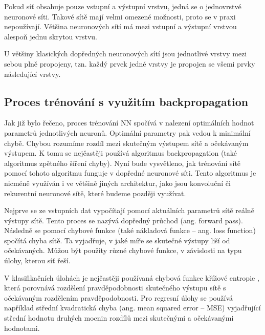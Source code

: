 Pokud síť obsahuje pouze vstupní a výstupní vrstvu, jedná se o jednovrstvé
neuronové síti. Takové sítě mají velmi omezené možnosti, proto se v praxi
nepoužívají. Většina neuronových sítí má mezi vstupní a výstupní vrstvou
alespoň jednu skrytou vrstvu.%

U většiny klasických dopředných neuronových sítí jsou jednotlivé vrstvy mezi
sebou plně propojeny, tzn. každý prvek jedné vrstvy je propojen se všemi prvky
následující vrstvy.


\subsection{Proces trénování s využitím backpropagation}

Jak již bylo řečeno, proces trénování NN spočívá v nalezení optimálních hodnot
parametrů jednotlivých neuronů. Optimální parametry pak vedou k minimální
chybě. Chybou rozumíme rozdíl mezi skutečným výstupem sítě a očekávaným
výstupem. K tomu se nejčastěji používá algoritmus backpropagation (také
algoritmus zpětného šíření chyby). Nyní bude vysvětleno, jak trénování sítě
pomocí tohoto algoritmu funguje v dopředné neuronové síti. Tento algoritmus je
nicméně využíván i ve většině jiných architektur, jako jsou konvoluční či
rekurentní neuronové sítě, které budeme později využívat.

Nejprve se ze vstupních dat vypočítají pomocí aktuálních parametrů sítě reálně
výstupy sítě. Tento proces se nazývá dopředný průchod (ang. forward pass).
Následně se pomocí chybové funkce (také nákladová funkce – ang. loss function)
spočítá chyba sítě. Ta vyjadřuje, v jaké míře se skutečné výstupy liší od
očekávaných. Můžou být použity různé chybové funkce, v závislosti na typu
úlohy, kterou síť řeší.

V klasifikačních úlohách je nejčastěji používaná chybová funkce křížové
entropie \cite{crossentropy}, která porovnává rozdělení pravděpodobnosti
skutečného výstupu sítě s očekávaným rozdělením pravděpodobnosti. Pro regresní
úlohy se používá například střední kvadratická chyba (ang. mean squared error –
MSE) \cite{mse} vyjadřující střední hodnotu druhých mocnin rozdílů mezi
skutečnými a očekávanými hodnotami.

